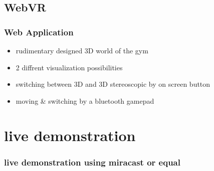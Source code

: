 \documentclass{beamer}
\begin{document}
\subsection{WebVR}
\begin{frame}
\frametitle{Web Application}
\begin{itemize}
  \item rudimentary designed 3D world of the gym
  \item 2 diffrent visualization possibilities
  \item switching between 3D and 3D stereoscopic by on screen button
  \item moving \& switching by a bluetooth gamepad
\end{itemize}
\end{frame}

\section{live demonstration}
\begin{frame}
\frametitle{live demonstration using miracast or equal}

\end{frame}
\end{document}
